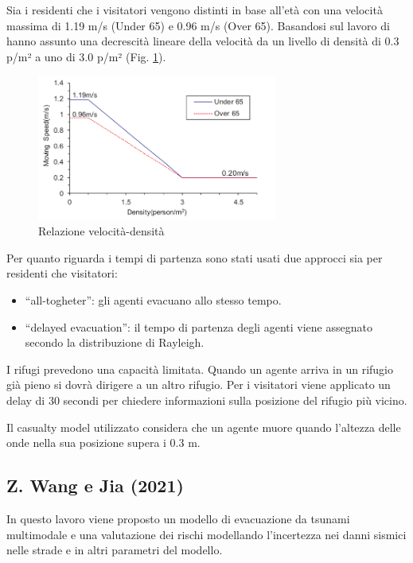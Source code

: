 Sia i residenti che i visitatori vengono distinti in base all'età con una velocità massima di 1.19 m/s (Under 65) e 0.96 m/s (Over 65).
Basandosi sul lavoro di \textcite{older1968movement} hanno assunto una decrescità lineare della 
velocità da un livello di densità di 0.3 p/m² a uno di 3.0 p/m² (Fig. \ref{fig:speed-linear}).

\begin{figure}[ht]
    \centering
    \includegraphics[width=0.7\textwidth]{images/speed_Linear.png}
    \caption{Relazione velocità-densità \textcite{takabatake2017simulated}}
    \label{fig:speed-linear}
\end{figure}

\pagebreak

Per quanto riguarda i tempi di partenza sono stati usati due approcci sia per residenti che visitatori:
\begin{itemize}
    \item ``all-togheter'': gli agenti evacuano allo stesso tempo.
    \item ``delayed evacuation'': il tempo di partenza degli agenti viene assegnato secondo la distribuzione di Rayleigh.
\end{itemize}

I rifugi prevedono una capacità limitata. Quando un agente arriva in un rifugio già pieno si dovrà dirigere a un altro rifugio.
Per i visitatori viene applicato un delay di 30 secondi per chiedere informazioni sulla posizione del rifugio più vicino.

Il casualty model utilizzato considera che un agente muore quando l'altezza delle onde nella sua posizione supera i 0.3 m.


\subsection{Z. Wang e Jia (2021)}
In questo lavoro viene proposto un modello di evacuazione da tsunami multimodale e una valutazione dei rischi modellando l'incertezza
nei danni sismici nelle strade e in altri parametri del modello.

